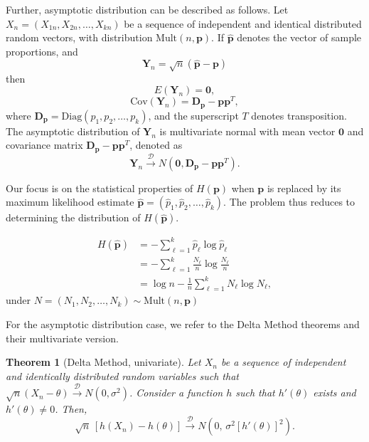 Further, asymptotic distribution can be described as follows. Let $X_n=(X_{1n},X_{2n},\dots,X_{kn})$ be a sequence of independent and identical distributed random vectors, with distribution $\text{Mult}(n,\mathbf{p})$. If $\widehat{\mathbf{p}}$ denotes the vector of sample proportions, and 
\[\mathbf{Y}_n=\sqrt{n}(\widehat{\mathbf{p}}-\mathbf{p})\] 
then
\[E(\mathbf{Y}_n)=\bm 0,\]
\[\text{Cov}(\mathbf{Y}_n)=\mathbf{D_p}-\mathbf{pp}^T,\]
where $\mathbf{D_p}=\text{Diag}(p_1,p_2,\dots,p_k)$, and the superscript $T$ denotes transposition. The asymptotic distribution of $\mathbf{Y}_n$ is multivariate normal with mean vector $\bm 0$ and covariance matrix $\mathbf{D_p}-\mathbf{pp}^T$, denoted as
%
\begin{equation}
	\mathbf{Y}_n \xrightarrow{\mathscr{D}} N(\mathbf{0}, \mathbf{D_p}-\mathbf{pp}^T).
	\label{eq:Cov} 
\end{equation}
 
Our focus is on the statistical properties of $H(\mathbf{p})$ when $\mathbf{p}$ is replaced by its maximum likelihood estimate $\widehat{\mathbf{p}} = (\widehat{p}_1, \widehat{p}_2, \dots, \widehat{p}_k)$. The problem thus reduces to determining the distribution of $H(\widehat{\mathbf{p}})$.

\begin{align}
	H(\widehat{\mathbf{p}})
	&= -\sum_{\ell=1}^k \widehat{p}_\ell \log \widehat{p}_\ell \nonumber \\
	&= -\sum_{\ell=1}^k \frac{N_\ell}{n} \log \frac{N_\ell}{n} \nonumber \\
	&= \log n - \frac{1}{n} \sum_{\ell=1}^k N_\ell \log N_\ell,
\end{align}
under $N=(N_1,N_2,\dots,N_k)\sim \text{Mult}(n,\mathbf{p})$

For the asymptotic distribution case, we refer to the Delta Method theorems and their multivariate version.

\theoremstyle{plain}
\newtheorem{theorem}{Theorem}

\begin{theorem}[Delta Method, univariate]
	Let $X_n$ be a sequence of independent and identically distributed random variables such that 
	$\sqrt{n}(X_n - \theta) \xrightarrow{\mathscr{D}} N(0,\sigma^2)$. 
	Consider a function $h$ such that $h'(\theta)$ exists and $h'(\theta)\neq 0$. 
	Then,
	\[
	\sqrt{n}\,[h(X_n)-h(\theta)] \xrightarrow{\mathscr{D}} N\!\left(0,\,\sigma^2 [h'(\theta)]^2\right).
	\]
\end{theorem}


